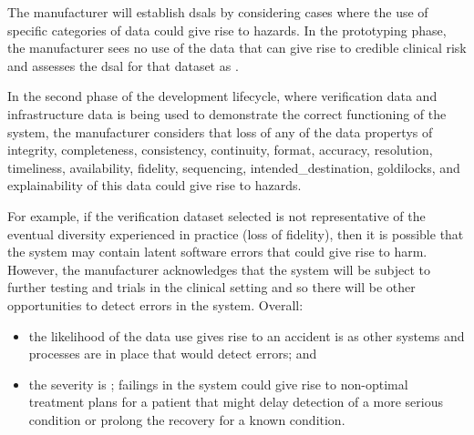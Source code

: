 The manufacturer will establish \glspl{dsal} by considering cases where the use of specific categories of data could give rise to \glspl{hazard}. In the prototyping phase, the manufacturer sees no use of the data that can give rise to credible clinical risk and assesses the \gls{dsal} for that \gls{dataset} as . 

In the second phase of the development lifecycle, where \gls{verification} data and infrastructure data is being used to demonstrate the correct functioning of the system, the manufacturer considers that loss of any of the \glspl{data property} of \gls{integrity}, \gls{completeness}, \gls{consistency}, \gls{continuity}, \gls{format}, \gls{accuracy}, \gls{resolution}, \gls{timeliness}, \gls{availability}, \gls{fidelity}, \gls{sequencing}, \gls{intended_destination}, \gls{goldilocks}, and explainability of this data could give rise to \glspl{hazard}.

For example, if the \gls{verification} \gls{dataset} selected is not representative of the eventual diversity experienced in practice (loss of \gls{fidelity}), then it is possible that the system may contain latent software errors that could give rise to harm. However, the manufacturer acknowledges that the system will be subject to further testing and trials in the clinical setting and so there will be other opportunities to detect errors in the system. Overall:
\begin{itemize}
  \item the likelihood of the data use gives rise to an accident is  as other systems and processes are in place that would detect errors; and
  \item the severity is ; failings in the system could give rise to non-optimal treatment plans for a patient that might delay detection of a more serious condition or prolong the recovery for a known condition.
\end{itemize}

